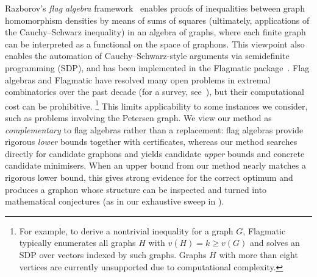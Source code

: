 \documentclass[11pt]{article}
\theoremstyle{plain}
\theoremstyle{definition}
\theoremstyle{remark}
\begin{document}
Razborov's \emph{flag algebra} framework~\citep{razborov2007flag} enables proofs of inequalities between graph homomorphism densities by means of sums of squares (ultimately, applications of the Cauchy--Schwarz inequality) in an algebra of graphs, where each finite graph can be interpreted as a functional on the space of graphons. This viewpoint also enables the automation of Cauchy--Schwarz-style arguments via semidefinite programming (SDP), and has been implemented in the {\sc Flagmatic} package~\citep{falgas2013applications}.
Flag algebras and Flagmatic have resolved many open problems in extremal combinatorics over the past decade (for a survey, see~\citet{razborov2013flag}), but their computational cost can be prohibitive. \footnote{For example, to derive a nontrivial inequality for a graph $G$, {\sc Flagmatic} typically enumerates all graphs $H$ with $v(H) = k \geq v(G)$ and solves an SDP over vectors indexed by such graphs. Graphs $H$ with more than eight vertices are currently unsupported due to computational complexity.}
This limits applicability to some instances we consider, such as problems involving the Petersen graph.
We view our method as \emph{complementary} to flag algebras rather than a replacement: flag algebras provide rigorous \emph{lower} bounds together with certificates, whereas our method searches directly for candidate graphons and yields candidate \emph{upper} bounds and concrete candidate minimisers. When an upper bound from our method nearly matches a rigorous lower bound, this gives strong evidence for the correct optimum and produces a graphon whose structure can be inspected and turned into mathematical conjectures (as in our exhaustive sweep in ).
\end{document}
